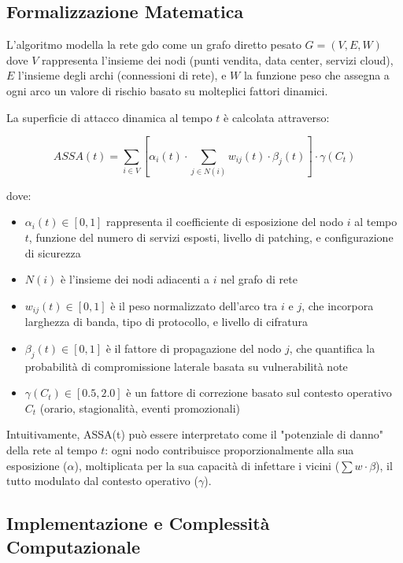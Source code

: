 \subsection{\texorpdfstring{Formalizzazione Matematica}{2.4.2 - Formalizzazione Matematica}}

L'algoritmo modella la rete \gls{gdo} come un grafo diretto pesato $G = (V, E, W)$ dove $V$ rappresenta l'insieme dei nodi (punti vendita, data center, servizi cloud), $E$ l'insieme degli archi (connessioni di rete), e $W$ la funzione peso che assegna a ogni arco un valore di rischio basato su molteplici fattori dinamici.

La superficie di attacco dinamica al tempo $t$ è calcolata attraverso:

\begin{equation}
ASSA(t) = \sum_{i \in V} \left[ \alpha_i(t) \cdot \sum_{j \in N(i)} w_{ij}(t) \cdot \beta_j(t) \right] \cdot \gamma(C_t)
\label{eq:assa_formula}
\end{equation}

dove:
\begin{itemize}
\item $\alpha_i(t) \in [0,1]$ rappresenta il coefficiente di esposizione del nodo $i$ al tempo $t$, funzione del numero di servizi esposti, livello di patching, e configurazione di sicurezza
\item $N(i)$ è l'insieme dei nodi adiacenti a $i$ nel grafo di rete
\item $w_{ij}(t) \in [0,1]$ è il peso normalizzato dell'arco tra $i$ e $j$, che incorpora larghezza di banda, tipo di protocollo, e livello di cifratura
\item $\beta_j(t) \in [0,1]$ è il fattore di propagazione del nodo $j$, che quantifica la probabilità di compromissione laterale basata su vulnerabilità note
\item $\gamma(C_t) \in [0.5, 2.0]$ è un fattore di correzione basato sul contesto operativo $C_t$ (orario, stagionalità, eventi promozionali)
\end{itemize}

Intuitivamente, ASSA(t) può essere interpretato come il "potenziale di danno" della rete al tempo $t$: ogni nodo contribuisce proporzionalmente alla sua esposizione ($\alpha$), moltiplicata per la sua capacità di infettare i vicini ($\sum w \cdot \beta$), il tutto modulato dal contesto operativo ($\gamma$).

\subsection{\texorpdfstring{Implementazione e Complessità Computazionale}{2.4.3 - Implementazione e Complessità Computazionale}}

